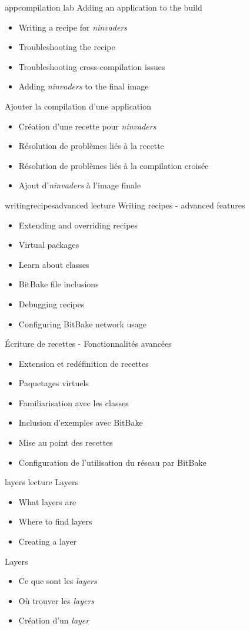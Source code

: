 {appcompilation}
{lab}
{Adding an application to the build}
{
  \begin{itemize}
  \item Writing a recipe for {\em ninvaders}
  \item Troubleshooting the recipe
  \item Troubleshooting cross-compilation issues
  \item Adding {\em ninvaders} to the final image
  \end{itemize}
}
{Ajouter la compilation d'une application}
{
  \begin{itemize}
  \item Création d'une recette pour {\em ninvaders}
  \item Résolution de problèmes liés à la recette
  \item Résolution de problèmes liés à la compilation croisée
  \item Ajout d'{\em ninvaders} à l'image finale
  \end{itemize}
}

{writingrecipesadvanced}
{lecture}
{Writing recipes - advanced features}
{
  \begin{itemize}
  \item Extending and overriding recipes
  \item Virtual packages
  \item Learn about classes
  \item BitBake file inclusions
  \item Debugging recipes
  \item Configuring BitBake network usage
  \end{itemize}
}
{Écriture de recettes - Fonctionnalités avancées}
{
  \begin{itemize}
  \item Extension et redéfinition de recettes
  \item Paquetages virtuels
  \item Familiarisation avec les classes
  \item Inclusion d'exemples avec BitBake
  \item Mise au point des recettes
  \item Configuration de l'utilisation du réseau par BitBake
  \end{itemize}
}

{layers}
{lecture}
{Layers}
{
  \begin{itemize}
  \item What layers are
  \item Where to find layers
  \item Creating a layer
  \end{itemize}
}
{Layers}
{
  \begin{itemize}
  \item Ce que sont les {\em layers}
  \item Où trouver les {\em layers}
  \item Création d'un {\em layer}
  \end{itemize}
}

